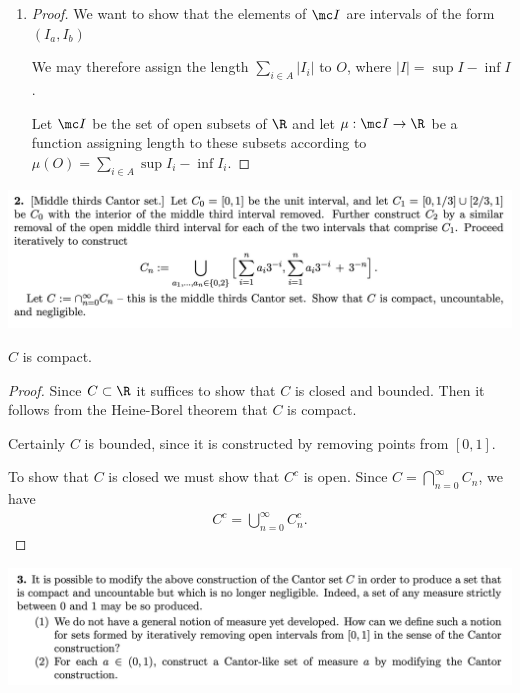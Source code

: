 \begin{enumerate}
\item
  \begin{proof}
     We want to show that the elements of $\mc I$ are intervals of the form $(I_a, I_b)$

    We may therefore assign the length $\sum_{i \in A} |I_i|$ to $O$, where $|I| = \sup I - \inf I$.

    Let $\mc I$ be the set of open subsets of $\R$ and let $\mu:\mc I \to \R$ be a function assigning length to
    these subsets according to $\mu(O) = \sum_{i\in A}\sup I_i - \inf I_i$.
  \end{proof}
\end{enumerate}



\begin{mdframed}
\includegraphics[width=400pt]{img/analysis--berkeley-202a-8d78.png}
\end{mdframed}

\begin{claim*}
  $C$ is compact.
\end{claim*}
\begin{proof}
  Since $C \subset \R$ it suffices to show that $C$ is closed and bounded. Then it follows from the Heine-Borel theorem that $C$ is compact.

  Certainly $C$ is bounded, since it is constructed by removing points from $[0, 1]$.

  To show that $C$ is closed we must show that $C^c$ is open. Since $C = \bigcap_{n=0}^\infty C_n$, we have
  \begin{align*}
    C^c = \bigcup_{n=0}^\infty C_n^c.
  \end{align*}

\end{proof}



\begin{mdframed}
\includegraphics[width=400pt]{img/analysis--berkeley-202a-6b7a.png}
\end{mdframed}



